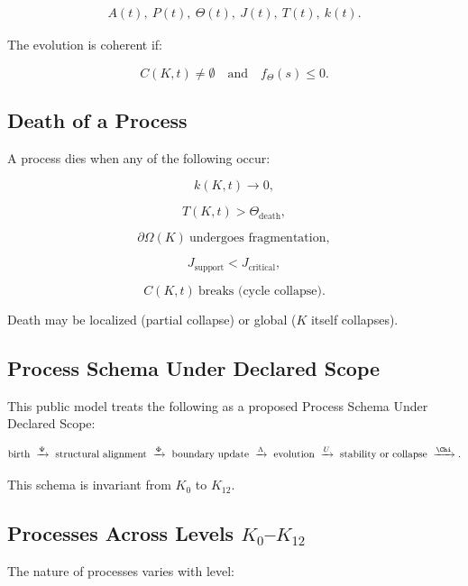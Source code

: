 \begin{align*}
A(t),\
P(t),\
\Theta(t),\
J(t),\
T(t),\
k(t).
\end{align*}

The evolution is coherent if:

\[
C(K,t) \neq \emptyset
\quad\text{and}\quad
f_{\Theta}(s) \le 0.
\]

\subsection{Death of a Process}

A process dies when any of the following occur:

\[
k(K,t) \to 0,
\]

\[
T(K,t) > \Theta_{\mathrm{death}},
\]

\[
\partial\Omega(K) \ \text{undergoes fragmentation},
\]

\[
J_{\mathrm{support}} < J_{\mathrm{critical}},
\]

\[
C(K,t) \ \text{breaks (cycle collapse)}.
\]

Death may be localized (partial collapse) or global ($K$ itself collapses).

\subsection{Process Schema Under Declared Scope}

This public model treats the following as a proposed Process Schema Under Declared Scope:

\[
\text{birth}
\ \xrightarrow{\Psi}
\ \text{structural alignment}
\ \xrightarrow{\Phi}
\ \text{boundary update}
\ \xrightarrow{\Lambda}
\ \text{evolution}
\ \xrightarrow{U}
\ \text{stability or collapse}
\ \xrightarrow{\Chi}.
\]

This schema is invariant from $K_0$ to $K_{12}$.

\subsection{Processes Across Levels \texorpdfstring{$K_0$}{K_0}--$K_{12}$}

The nature of processes varies with level:

